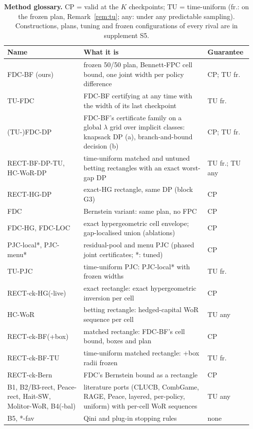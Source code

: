 \documentclass[sigconf,anonymous,review]{acmart}
\begin{document}
\begin{table}[H]
\caption{\textbf{Method glossary.} CP = valid at the $K$ checkpoints; TU = time-uniform (fr.: on the frozen plan, Remark~\ref{rem:tu}; any: under any predictable sampling). Constructions, plans, tuning and frozen configurations of every rival are in supplement S5.}
\label{tab:glossary}
\footnotesize
\setlength{\tabcolsep}{3pt}
\begin{tabular}{@{}>{\raggedright\arraybackslash}p{2.05cm}>{\raggedright\arraybackslash}p{4.05cm}>{\raggedright\arraybackslash}p{1.25cm}@{}}
\toprule
Name & What it is & Guarantee \\
\midrule
FDC-BF (ours) & frozen 50/50 plan, Bennett-FPC cell bound, one joint width per policy difference & CP; TU fr. \\
TU-FDC & FDC-BF certifying at any time with the width of its last checkpoint & TU fr. \\
(TU-)FDC-DP & FDC-BF's certificate family on a global $\lambda$ grid over implicit classes: knapsack DP (a), branch-and-bound decision (b) & CP; TU fr. \\
RECT-BF-DP-TU, HC-WoR-DP & time-uniform matched and untuned betting rectangles with an exact worst-gap DP & TU fr.; TU any \\
RECT-HG-DP & exact-HG rectangle, same DP (block G3) & CP \\
FDC & Bernstein variant: same plan, no FPC & CP \\
FDC-HG, FDC-LOC & exact hypergeometric cell envelope; gap-localised union (ablations) & CP \\
PJC-local*, PJC-menu* & residual-pool and menu PJC (phased joint certificates; *: tuned) & CP \\
TU-PJC & time-uniform PJC: PJC-local* with frozen widths & TU fr. \\
RECT-ck-HG(-live) & exact rectangle: exact hypergeometric inversion per cell & CP \\
HC-WoR & betting rectangle: hedged-capital WoR sequence per cell & TU any \\
RECT-ck-BF(+box) & matched rectangle: FDC-BF's cell bound, boxes and plan & CP \\
RECT-ck-BF-TU & time-uniform matched rectangle: +box radii frozen & TU fr. \\
RECT-ck-Bern & FDC's Bernstein bound as a rectangle & CP \\
B1, B2/B3-rect, Peace-rect, Hait-SW, Molitor-WoR, B4(-bal) & literature ports (CLUCB, CombGame, RAGE, Peace, layered, per-policy, uniform) with per-cell WoR sequences & TU any \\
B5, *-fav & Qini and plug-in stopping rules & none \\
\bottomrule
\end{tabular}
\end{table}
\end{document}
